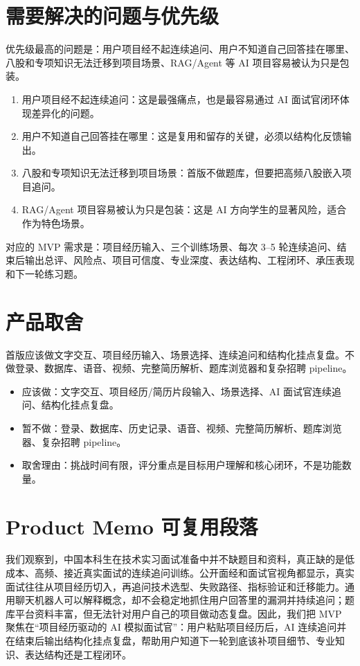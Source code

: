 \documentclass[UTF8,11pt]{ctexart}
\begin{document}
\section{需要解决的问题与优先级}


\FloatBarrier

优先级最高的问题是：用户项目经不起连续追问、用户不知道自己回答挂在哪里、八股和专项知识无法迁移到项目场景、RAG/Agent 等 AI 项目容易被认为只是包装。
\begin{enumerate}
\item 用户项目经不起连续追问：这是最强痛点，也是最容易通过 AI 面试官闭环体现差异化的问题。
\item 用户不知道自己回答挂在哪里：这是复用和留存的关键，必须以结构化反馈输出。
\item 八股和专项知识无法迁移到项目场景：首版不做题库，但要把高频八股嵌入项目追问。
\item RAG/Agent 项目容易被认为只是包装：这是 AI 方向学生的显著风险，适合作为特色场景。
\end{enumerate}

对应的 MVP 需求是：项目经历输入、三个训练场景、每次 3--5 轮连续追问、结束后输出总评、风险点、项目可信度、专业深度、表达结构、工程闭环、承压表现和下一轮练习题。

\section{产品取舍}

首版应该做文字交互、项目经历输入、场景选择、连续追问和结构化挂点复盘。不做登录、数据库、语音、视频、完整简历解析、题库浏览器和复杂招聘 pipeline。
\begin{itemize}
\item 应该做：文字交互、项目经历/简历片段输入、场景选择、AI 面试官连续追问、结构化挂点复盘。
\item 暂不做：登录、数据库、历史记录、语音、视频、完整简历解析、题库浏览器、复杂招聘 pipeline。
\item 取舍理由：挑战时间有限，评分重点是目标用户理解和核心闭环，不是功能数量。
\end{itemize}

\section{Product Memo 可复用段落}

我们观察到，中国本科生在技术实习面试准备中并不缺题目和资料，真正缺的是低成本、高频、接近真实面试的连续追问训练。公开面经和面试官视角都显示，真实面试往往从项目经历切入，再追问技术选型、失败路径、指标验证和迁移能力。通用聊天机器人可以解释概念，却不会稳定地抓住用户回答里的漏洞并持续追问；题库平台资料丰富，但无法针对用户自己的项目做动态复盘。因此，我们把 MVP 聚焦在“项目经历驱动的 AI 模拟面试官”：用户粘贴项目经历后，AI 连续追问并在结束后输出结构化挂点复盘，帮助用户知道下一轮到底该补项目细节、专业知识、表达结构还是工程闭环。
\end{document}
